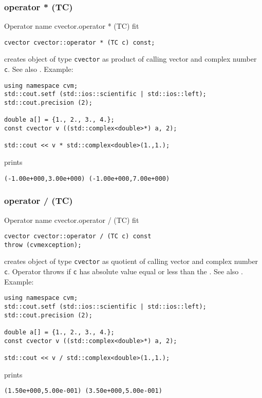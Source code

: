 \subsubsection{operator * (TC)}
Operator%
\pdfdest name {cvector.operator * (TC)} fit
\begin{verbatim}
cvector cvector::operator * (TC c) const;
\end{verbatim}
creates  object of type \verb"cvector" as  product of
 calling vector and  complex number \verb"c".
See also .
Example:
\begin{Verbatim}
using namespace cvm;
std::cout.setf (std::ios::scientific | std::ios::left);
std::cout.precision (2);

double a[] = {1., 2., 3., 4.};
const cvector v ((std::complex<double>*) a, 2);

std::cout << v * std::complex<double>(1.,1.);
\end{Verbatim}
prints
\begin{Verbatim}
(-1.00e+000,3.00e+000) (-1.00e+000,7.00e+000)
\end{Verbatim}
\newpage




\subsubsection{operator / (TC)}
Operator%
\pdfdest name {cvector.operator / (TC)} fit
\begin{verbatim}
cvector cvector::operator / (TC c) const
throw (cvmexception);
\end{verbatim}
creates  object of type \verb"cvector" as  quotient of
 calling vector and  complex number \verb"c".
Operator throws
if \verb"c" has  absolute value equal or less
than the
.
See also .
Example:
\begin{Verbatim}
using namespace cvm;
std::cout.setf (std::ios::scientific | std::ios::left);
std::cout.precision (2);

double a[] = {1., 2., 3., 4.};
const cvector v ((std::complex<double>*) a, 2);

std::cout << v / std::complex<double>(1.,1.);
\end{Verbatim}
prints
\begin{Verbatim}
(1.50e+000,5.00e-001) (3.50e+000,5.00e-001)
\end{Verbatim}
\newpage



